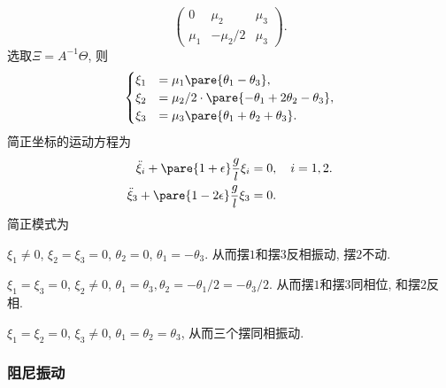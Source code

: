 \documentclass[../LectureNotes.tex]{subfiles}
\begin{document}
\begin{sample}
\begin{ex}
\[\begin{pmatrix}
            0 & \mu_2 & \mu_3 \\
            \mu_1 & -\mu_2/2 & \mu_3
        \end{pmatrix}. \]
        选取$\Xi = A^{-1}\Theta$, 则
        \[ \begin{cases}
            \xi_1 &= \mu_1 \pare{\theta_1 - \theta_3}, \\
            \xi_2 &= \mu_2/2\cdot \pare{-\theta_1 + 2\theta_2 - \theta_3}, \\
            \xi_3 &= \mu_3 \pare{\theta_1 + \theta_2 + \theta_3}.
        \end{cases} \]
        简正坐标的运动方程为
        \begin{align*}
            \ddot{\xi}_i + \pare{1+\epsilon} \frac{g}{l} \xi_i &= 0,\quad i = 1,2. \\
            \ddot{\xi}_3 + \pare{1-2\epsilon} \frac{g}{l} \xi_3 &= 0.
        \end{align*}
        简正模式为
        \begin{cenum}
            \item $\xi_1 \neq 0$, $\xi_2 = \xi_3= 0$, $\theta_2 = 0$, $\theta_1 = -\theta_3$. 从而摆$1$和摆$3$反相振动, 摆$2$不动.
            \item $\xi_1 = \xi_3 = 0$, $\xi_2 \neq 0$, $\theta_1 = \theta_3,\theta_2 = -\theta_1/2 = -\theta_3/2$. 从而摆$1$和摆$3$同相位, 和摆$2$反相.
            \item $\xi_1 = \xi_2 = 0$, $\xi_3 \neq 0$, $\theta_1=\theta_2=\theta_3$, 从而三个摆同相振动.
        \end{cenum}
    \end{ex}
\end{sample}



\subsubsection{阻尼振动} %
\label{ssub:阻尼振动}
\end{document}
